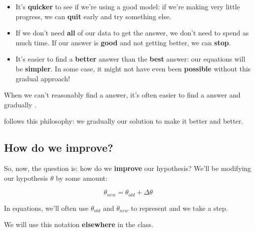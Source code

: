         \begin{itemize}
            \item It's \textbf{quicker} to see if we're using a good model: if we're making very little progress, we can \textbf{quit} early and try something else.
            
            \item If we don't need \textbf{all} of our data to get the answer, we don't need to spend as much time. If our answer is \textbf{good} and not getting better, we can \textbf{stop}.
            
            \item It's easier to find a \textbf{better} answer than the \textbf{best} answer: our equations will be \textbf{simpler}. In some case, it might not have even been \textbf{possible} without this gradual approach!\\
        \end{itemize}
        
        \begin{concept}
            When we can't reasonably find a  answer, it's often easier to find a  answer and gradually .
            
             follows this philosophy: we gradually  our solution to make it better and better.
        \end{concept}
        
        
        
    \subsection{How do we improve?}
    
        So, now, the question is: how do we \textbf{improve} our hypothesis? We'll be modifying our hypothesis $\theta$ by some amount:
        
        \begin{equation}
            \theta_{new} = \theta_{old} + \Delta \theta
        \end{equation}
        
        \begin{notation}
            In equations, we'll often use $\theta_{old}$ and $\theta_{new}$ to represent  and  we take a step.
            
            We will use this notation \textbf{elsewhere} in the class.
        \end{notation}
        
